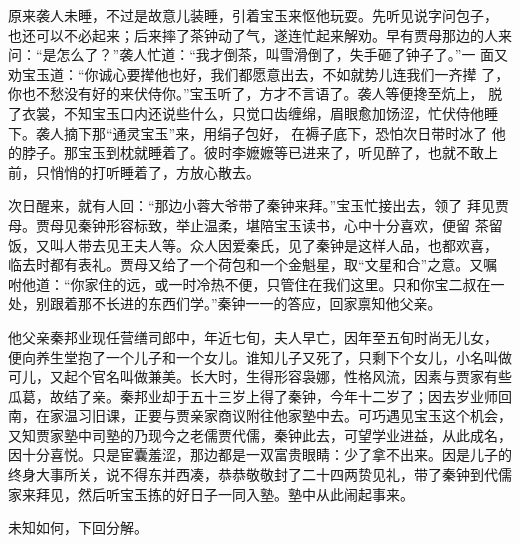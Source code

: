 原来袭人未睡，不过是故意儿装睡，引着宝玉来怄他玩耍。先听见说字问包子，
也还可以不必起来；后来摔了茶钟动了气，遂连忙起来解劝。早有贾母那边的人来
问：“是怎么了？”袭人忙道：“我才倒茶，叫雪滑倒了，失手砸了钟子了。”一
面又劝宝玉道：“你诚心要撵他也好，我们都愿意出去，不如就势儿连我们一齐撵
了，你也不愁没有好的来伏侍你。”宝玉听了，方才不言语了。袭人等便搀至炕上，
脱了衣裳，不知宝玉口内还说些什么，只觉口齿缠绵，眉眼愈加饧涩，忙伏侍他睡
下。袭人摘下那“通灵宝玉”来，用绢子包好，在褥子底下，恐怕次日带时冰了
他的脖子。那宝玉到枕就睡着了。彼时李嬷嬷等已进来了，听见醉了，也就不敢上
前，只悄悄的打听睡着了，方放心散去。

次日醒来，就有人回：“那边小蓉大爷带了秦钟来拜。”宝玉忙接出去，领了
拜见贾母。贾母见秦钟形容标致，举止温柔，堪陪宝玉读书，心中十分喜欢，便留
茶留饭，又叫人带去见王夫人等。众人因爱秦氏，见了秦钟是这样人品，也都欢喜，
临去时都有表礼。贾母又给了一个荷包和一个金魁星，取“文星和合”之意。又嘱
咐他道：“你家住的远，或一时冷热不便，只管住在我们这里。只和你宝二叔在一
处，别跟着那不长进的东西们学。”秦钟一一的答应，回家禀知他父亲。

他父亲秦邦业现任营缮司郎中，年近七旬，夫人早亡，因年至五旬时尚无儿女，
便向养生堂抱了一个儿子和一个女儿。谁知儿子又死了，只剩下个女儿，小名叫做
可儿，又起个官名叫做兼美。长大时，生得形容袅娜，性格风流，因素与贾家有些
瓜葛，故结了亲。秦邦业却于五十三岁上得了秦钟，今年十二岁了；因去岁业师回
南，在家温习旧课，正要与贾亲家商议附往他家塾中去。可巧遇见宝玉这个机会，
又知贾家塾中司塾的乃现今之老儒贾代儒，秦钟此去，可望学业进益，从此成名，
因十分喜悦。只是宦囊羞涩，那边都是一双富贵眼睛：少了拿不出来。因是儿子的
终身大事所关，说不得东并西凑，恭恭敬敬封了二十四两贽见礼，带了秦钟到代儒
家来拜见，然后听宝玉拣的好日子一同入塾。塾中从此闹起事来。

未知如何，下回分解。